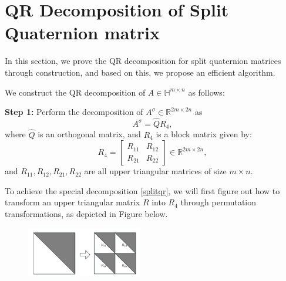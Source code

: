 \documentclass[5p]{elsarticle}
\numberwithin{equation}{section}
\begin{document}
\section{QR Decomposition of Split Quaternion matrix}
In this section, we prove the QR decomposition for split quaternion matrices through construction, and based on this, we propose an efficient algorithm.

We construct the QR decomposition of $A \in \mathbb{H}^{m \times n}$ as follows:

\textbf{Step 1:} Perform the decomposition of $A^\sigma \in \mathbb{R}^{2m \times 2n}$ as \begin{equation}\label{splitqr}A^\sigma = \hat{Q} R_4,\end{equation} where $\hat{Q}$ is an orthogonal matrix, and $R_4$ is a block matrix given by:
\begin{equation}\label{r4}
R_4 = \begin{bmatrix}
    R_{11} & R_{12} \\
    R_{21} & R_{22}
\end{bmatrix} \in \mathbb{R}^{2m \times 2n},
\end{equation}
and $R_{11}, R_{12},R_{21},R_{22}$ are all upper triangular matrices of size $m \times n$.

To achieve the special decomposition \eqref{splitqr},  we will first figure out how to transform an upper triangular matrix $R$ into $R_4$ through permutation transformations, as depicted in Figure below.
\begin{figure}[htbp]
        \centering
        \includegraphics[width=0.45\textwidth,keepaspectratio=true]{Upper triangular.png} %
         \label{fig:Upper triangular}
\end{figure}
\end{document}
